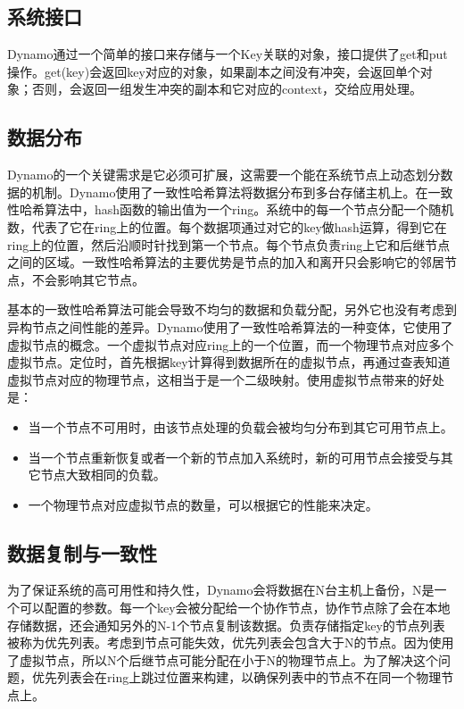 \documentclass[UTF8]{article}
\begin{document}
	\subsection{系统接口}
		Dynamo通过一个简单的接口来存储与一个Key关联的对象，接口提供了get和put操作。get(key)会返回key对应的对象，如果副本之间没有冲突，会返回单个对象；否则，会返回一组发生冲突的副本和它对应的context，交给应用处理。

	\subsection{数据分布}
		Dynamo的一个关键需求是它必须可扩展，这需要一个能在系统节点上动态划分数据的机制。Dynamo使用了一致性哈希算法将数据分布到多台存储主机上。在一致性哈希算法中，hash函数的输出值为一个ring。系统中的每一个节点分配一个随机数，代表了它在ring上的位置。每个数据项通过对它的key做hash运算，得到它在ring上的位置，然后沿顺时针找到第一个节点。每个节点负责ring上它和后继节点之间的区域。一致性哈希算法的主要优势是节点的加入和离开只会影响它的邻居节点，不会影响其它节点。

		基本的一致性哈希算法可能会导致不均匀的数据和负载分配，另外它也没有考虑到异构节点之间性能的差异。Dynamo使用了一致性哈希算法的一种变体，它使用了虚拟节点的概念。一个虚拟节点对应ring上的一个位置，而一个物理节点对应多个虚拟节点。定位时，首先根据key计算得到数据所在的虚拟节点，再通过查表知道虚拟节点对应的物理节点，这相当于是一个二级映射。使用虚拟节点带来的好处是：
		\begin{itemize}
			\item
				当一个节点不可用时，由该节点处理的负载会被均匀分布到其它可用节点上。
			\item
                     当一个节点重新恢复或者一个新的节点加入系统时，新的可用节点会接受与其它节点大致相同的负载。
                \item
                     一个物理节点对应虚拟节点的数量，可以根据它的性能来决定。
		\end{itemize}
	
	\subsection{数据复制与一致性}
		为了保证系统的高可用性和持久性，Dynamo会将数据在N台主机上备份，N是一个可以配置的参数。每一个key会被分配给一个协作节点，协作节点除了会在本地存储数据，还会通知另外的N-1个节点复制该数据。负责存储指定key的节点列表被称为优先列表。考虑到节点可能失效，优先列表会包含大于N的节点。因为使用了虚拟节点，所以N个后继节点可能分配在小于N的物理节点上。为了解决这个问题，优先列表会在ring上跳过位置来构建，以确保列表中的节点不在同一个物理节点上。
\end{document}
